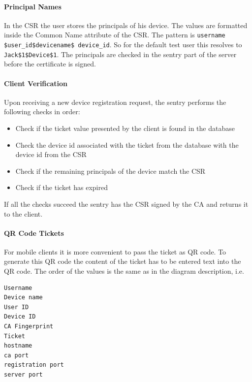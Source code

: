\documentclass{memoir}
\begin{document}
\paragraph{Principal Names}

In the CSR the user stores the principals of his device. The values are formatted inside the Common Name attribute of the CSR. The pattern is \texttt{username \$user\_id\$devicename\$ device\_id}. So for the default test user this resolves to \texttt{Jack\$1\$Device\$1}. The principals are checked in the sentry part of the server before the certificate is signed.

\paragraph{Client Verification}

Upon receiving a new device registration request, the sentry performs the following checks in order:
\begin{itemize}
\item Check if the ticket value presented by the client is found in the database

\item Check the device id associated with the ticket from the database with the device id from the CSR

\item Check if the remaining principals of the device match the CSR

\item Check if the ticket has expired
\end{itemize}

If all the checks succeed the sentry has the CSR signed by the CA and returns it to the client.

\paragraph{QR Code Tickets}

For mobile clients it is more convenient to pass the ticket as QR code. To generate this QR code the content of the ticket has to be entered text into the QR code. The order of the values is the same as in the diagram description, i.e.

\begin{lstlisting}
Username
Device name
User ID
Device ID
CA Fingerprint
Ticket
hostname
ca port
registration port
server port
\end{lstlisting}
\end{document}
